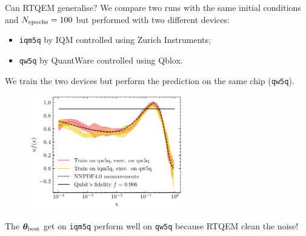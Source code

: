 \documentclass[8pt, xcolor={svgnames}, hyperref={linkcolor=black}]{beamer}
\begin{document}
\begin{frame}{Can RTQEM generalise?}
We compare two runs with the same initial conditions and $N_{\rm epochs}=100$ but 
performed with two different devices: 
\begin{itemize}
    \item[\faTerminal]\texttt{iqm5q} by IQM controlled using Zurich Instruments;
    \item[\faTerminal]\texttt{qw5q} by QuantWare controlled using Qblox.
\end{itemize}
We train the two devices but perform the prediction on the same chip (\texttt{qw5q}).

\begin{figure}
    \includegraphics[width=0.6\textwidth]{figures/benchs.pdf}%
\end{figure}
The $\bm{\theta}_{\rm best}$ get on \texttt{iqm5q} perform well on \texttt{qw5q} because RTQEM clean the noise!
\end{frame}
\end{document}
